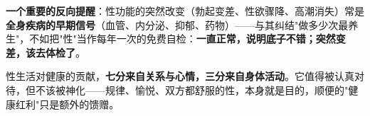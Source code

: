 \vspace{0.5em}
\noindent\textbf{一个重要的反向提醒}：性功能的突然改变（勃起变差、性欲骤降、高潮消失）常是\textbf{全身疾病的早期信号}（血管、内分泌、抑郁、药物）——与其纠结"做多少次最养生"，不如把"性"当作每年一次的免费自检：\textbf{一直正常，说明底子不错；突然变差，该去体检了}。

\begin{tcolorbox}[colback=pink!5!white,colframe=red!50!black,title=贴心小叮咛]
性生活对健康的贡献，\textbf{七分来自关系与心情，三分来自身体活动}。它值得被认真对待，但不该被神化——规律、愉悦、双方都舒服的性，本身就是目的，顺便的"健康红利"只是额外的馈赠。
\end{tcolorbox}

